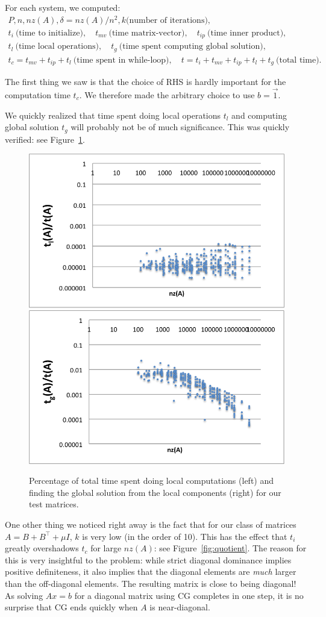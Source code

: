 \documentclass[11pt]{amsart}
\theoremstyle{definition}
\begin{document}
For each system, we computed:
\begin{gather*} 
P, n, nz(A), \delta = nz(A)/n^2, k \text{(number of iterations)}, \\
t_i~ \text{(time to initialize)}, \quad t_{mv}~ \text{(time matrix-vector)}, \quad t_{ip}~ \text{(time inner product)}, \\
t_l~ \text{(time local operations)}, \quad t_g~ \text{(time spent computing global solution)}, \\
t_c = t_{mv} + t_{ip} + t_l~ \text{(time spent in while-loop)}, \quad t = t_i + t_{mv} + t_{ip} + t_l + t_g~ \text{(total time)}.
\end{gather*}

The first thing we saw is that the choice of RHS is hardly important for the computation time $t_c$. We therefore made the arbitrary choice to use $b = \vec 1$.

We quickly realized that time spent doing local operations $t_l$ and computing global solution $t_g$ will probably not be of much significance. This was quickly verified: see Figure~\ref{fig:nonsig}.
\begin{figure}
  \includegraphics[width=0.49\linewidth]{tlt.png}
  \includegraphics[width=0.49\linewidth]{tgt.png}
  \caption{Percentage of total time spent doing local computations (left) and finding the global solution from the local components (right) for our test matrices.}
  \label{fig:nonsig}
\end{figure}

One other thing we noticed right away is the fact that for our class of matrices $A = B + B^\top + \mu I$, $k$ is very low (in the order of 10). This has the effect that $t_i$ greatly overshadows $t_c$ for large $nz(A)$: see Figure~\ref{fig:quotient}. The reason for this is very insightful to the problem: while strict diagonal dominance implies positive definiteness, it also implies that the diagonal elements are \emph{much} larger than the off-diagonal elements. The resulting matrix is close to being diagonal! As solving $Ax=b$ for a diagonal matrix using CG completes in one step, it is no surprise that CG ends quickly when $A$ is near-diagonal.
\end{document}
